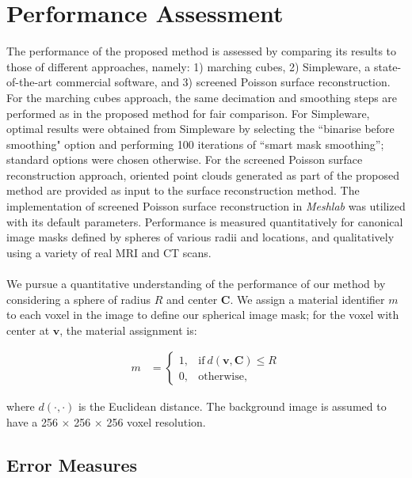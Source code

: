 \section{Performance Assessment}
%

The performance of the proposed method is assessed by comparing its results to those of {different approaches, namely: 1) marching cubes, 2) Simpleware, a state-of-the-art commercial software, and 3) screened Poisson surface reconstruction. For the marching cubes approach, the same decimation and smoothing steps are performed as in the proposed method for fair comparison. For Simpleware, optimal results were obtained from {Simpleware} by selecting the ``binarise before smoothing" option and performing 100 iterations of ``smart mask smoothing''; standard options were chosen otherwise. For the screened Poisson surface reconstruction approach, oriented point clouds generated as part of the proposed method are provided as input to the surface reconstruction method. The implementation of screened Poisson surface reconstruction in \textit{Meshlab} was utilized with its default parameters.} Performance is measured quantitatively for canonical image masks defined by spheres of various radii and locations, and qualitatively using a variety of real MRI and CT scans. \\ \\
%
We pursue a quantitative understanding of the performance of our method by considering a sphere of radius $R$ and center $\bm{C}$.  We assign a material identifier $m$ to each voxel in the image to define our spherical image mask; for the voxel with center at $\bm{v}$, the material assignment is:
\begin{linenomath}\begin{align} 
	m &=  \begin{cases}
		1, & \text{if}\ d \left(\bm{v},\bm{C}\right) \le R \\
		0, & \text{otherwise},
	\end{cases}
\end{align}\end{linenomath}
where $d(\cdot,\cdot)$ is the Euclidean distance. The background image is assumed to have a 256 $\times$ 256 $\times$ 256 voxel resolution.
\subsection{{Error Measures}}
\label{Error Measures}

